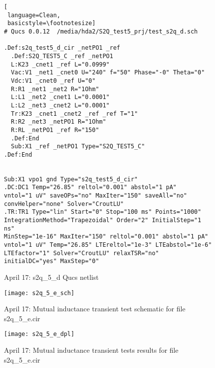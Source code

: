 \begin{figure}
\begin{lstlisting}[
 language=Clean, 
 basicstyle=\footnotesize]
# Qucs 0.0.12  /media/hda2/S2Q_test5_prj/test_s2q_d.sch

.Def:s2q_test5_d_cir _netPO1 _ref
  .Def:S2Q_TEST5_C _ref _netPO1
  L:K23 _cnet1 _ref L="0.0999"
  Vac:V1 _net1 _cnet0 U="240" f="50" Phase="-0" Theta="0"
  Vdc:V1 _cnet0 _ref U="0"
  R:R1 _net1 _net2 R="1Ohm"
  L:L1 _net2 _cnet1 L="0.0001"
  L:L2 _net3 _cnet2 L="0.0001"
  Tr:K23 _cnet1 _cnet2 _ref _ref T="1"
  R:R2 _net3 _netPO1 R="1Ohm"
  R:RL _netPO1 _ref R="150"
  .Def:End
  Sub:X1 _ref _netPO1 Type="S2Q_TEST5_C"
.Def:End


Sub:X1 vpo1 gnd Type="s2q_test5_d_cir"
.DC:DC1 Temp="26.85" reltol="0.001" abstol="1 pA" 
vntol="1 uV" saveOPs="no" MaxIter="150" saveAll="no" 
convHelper="none" Solver="CroutLU"
.TR:TR1 Type="lin" Start="0" Stop="100 ms" Points="1000" 
IntegrationMethod="Trapezoidal" Order="2" InitialStep="1 ns" 
MinStep="1e-16" MaxIter="150" reltol="0.001" abstol="1 pA" 
vntol="1 uV" Temp="26.85" LTEreltol="1e-3" LTEabstol="1e-6" 
LTEfactor="1" Solver="CroutLU" relaxTSR="no" initialDC="yes" MaxStep="0"

\end{lstlisting}

 \caption{April 17: s2q\_5\_d Qucs netlist}
  \label{fig:s2q_5_d_qucs}
\end{figure} 



\begin{figure}
  \centering
  \texttt{[image: s2q\_5\_e\_sch]} 
  \caption{April 17: Mutual inductance transient test schematic for file s2q\_5\_e.cir}
  \label{fig:s2q_5_e_sch}
\end{figure} 

\begin{figure}
  \centering
  \texttt{[image: s2q\_5\_e\_dpl]} 
  \caption{April 17: Mutual inductance transient tests results for file s2q\_5\_e.cir}
  \label{fig:s2q_5_e_dpl}
\end{figure} 

